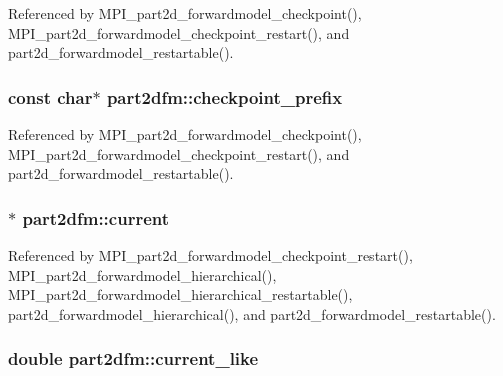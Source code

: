 Referenced by M\+P\+I\+\_\+part2d\+\_\+forwardmodel\+\_\+checkpoint(), M\+P\+I\+\_\+part2d\+\_\+forwardmodel\+\_\+checkpoint\+\_\+restart(), and part2d\+\_\+forwardmodel\+\_\+restartable().

\subsubsection[{\texorpdfstring{checkpoint\+\_\+prefix}{checkpoint_prefix}}]{\setlength{\rightskip}{0pt plus 5cm}const char$\ast$ part2dfm\+::checkpoint\+\_\+prefix}\hypertarget{structpart2dfm_ae70d8586e036ef85214eec8ef68ed857}{}\label{structpart2dfm_ae70d8586e036ef85214eec8ef68ed857}


Referenced by M\+P\+I\+\_\+part2d\+\_\+forwardmodel\+\_\+checkpoint(), M\+P\+I\+\_\+part2d\+\_\+forwardmodel\+\_\+checkpoint\+\_\+restart(), and part2d\+\_\+forwardmodel\+\_\+restartable().

\subsubsection[{\texorpdfstring{current}{current}}]{ $\ast$ part2dfm\+::current}\hypertarget{structpart2dfm_ac5b024b70caf5a93dfe11c68e4276d91}{}\label{structpart2dfm_ac5b024b70caf5a93dfe11c68e4276d91}


Referenced by M\+P\+I\+\_\+part2d\+\_\+forwardmodel\+\_\+checkpoint\+\_\+restart(), M\+P\+I\+\_\+part2d\+\_\+forwardmodel\+\_\+hierarchical(), M\+P\+I\+\_\+part2d\+\_\+forwardmodel\+\_\+hierarchical\+\_\+restartable(), part2d\+\_\+forwardmodel\+\_\+hierarchical(), and part2d\+\_\+forwardmodel\+\_\+restartable().

\subsubsection[{\texorpdfstring{current\+\_\+like}{current_like}}]{\setlength{\rightskip}{0pt plus 5cm}double part2dfm\+::current\+\_\+like}\hypertarget{structpart2dfm_a6d04019e1d6b26f5b7971a0b059d7b03}{}\label{structpart2dfm_a6d04019e1d6b26f5b7971a0b059d7b03}


